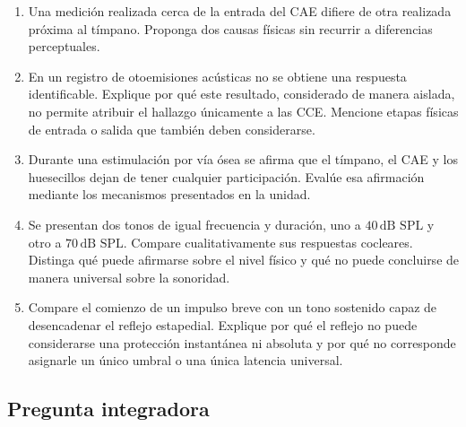 \begin{enumerate}[label=\textbf{A\arabic*.},leftmargin=*]
    \item Una medición realizada cerca de la entrada del CAE difiere de otra
    realizada próxima al tímpano. Proponga dos causas físicas sin recurrir a
    diferencias perceptuales.

    \item En un registro de otoemisiones acústicas no se obtiene una respuesta
    identificable. Explique por qué este resultado, considerado de manera
    aislada, no permite atribuir el hallazgo únicamente a las CCE. Mencione
    etapas físicas de entrada o salida que también deben considerarse.

    \item Durante una estimulación por vía ósea se afirma que el tímpano, el
    CAE y los huesecillos dejan de tener cualquier participación. Evalúe esa
    afirmación mediante los mecanismos presentados en la unidad.

    \item Se presentan dos tonos de igual frecuencia y duración, uno a
    \(40\,\text{dB SPL}\) y otro a \(70\,\text{dB SPL}\). Compare
    cualitativamente sus respuestas cocleares. Distinga qué puede afirmarse
    sobre el nivel físico y qué no puede concluirse de manera universal sobre
    la sonoridad.

    \item Compare el comienzo de un impulso breve con un tono sostenido capaz
    de desencadenar el reflejo estapedial. Explique por qué el reflejo no puede
    considerarse una protección instantánea ni absoluta y por qué no
    corresponde asignarle un único umbral o una única latencia universal.
\end{enumerate}

\subsection*{Pregunta integradora}

